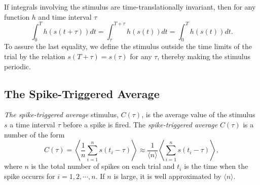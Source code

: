 
\begin{prop}
  If integrals involving the stimulus are time-translationally invariant,
  then for any function $h$ and time interval $\tau $
  \begin{equation}
    \label{equ:1.18}
    \int_0^T h(s(t+\tau)) dt = \int_{\tau}^{T+\tau} h(s(t)) dt = \int_0^T h(s(t)) dt.
  \end{equation}
  To assure the last equality, we define the stimulus outside the time limits of the trial by the relation 
  $s(T+\tau) = s(\tau)$ for any $\tau$, thereby making the stimulus periodic.
\end{prop}

\subsection{The Spike-Triggered Average}
\begin{defn}
  \label{defn:Spi-Tri Ave}
  \emph{The spike-triggered average} stimulus, $C(\tau)$, is the average value of the stimulus $s$ a time interval $\tau$ 
  before a spike is fired. The \emph{spike-triggered average} $C(\tau)$ is a number of the form
  \begin{equation}
    \label{equ:1.19}
    C(\tau) = \left \langle \frac{1}{n} \sum_{i=1}^{n} s(t_i - \tau) \right \rangle \approx \frac{1}{\langle n \rangle} \left \langle \sum_{i=1}^n s(t_i - \tau) \right \rangle,
  \end{equation}
  where $n$ is the total number of spikes on each trial and $t_i$ is the time when the spike occurrs for $i = 1, 2, \cdots, n$.  If $n$ is large, it is well approximated by $\langle n \rangle$.
\end{defn}


